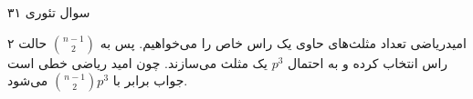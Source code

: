 سوال تئوری ۳۱

امیدریاضی تعداد مثلث‌های حاوی یک راس خاص را می‌خواهیم.
پس به 
$\binom{n-1}{2}$
حالت ۲ راس انتخاب کرده و به احتمال 
$p^3$
یک مثلث می‌سازند.
چون امید ریاضی خطی است جواب برابر با
$\binom{n-1}{2}p^3$
می‌شود.